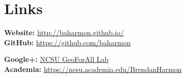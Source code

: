 \documentclass[]{baharmon-cv}
\begin{document}
{{{{{\sectiondivider


\section{Links} 
\begin{minipage}{0.45\textwidth} 
\textbf{Website:} \href{http://baharmon.github.io/}{http://baharmon.github.io/} \vspace{0.36em} \\ 
\textbf{GitHub:} \href{https://github.com/baharmon}{https://github.com/baharmon} %
\end{minipage} 
\begin{minipage}{0.45\textwidth} 
\textbf{Google+:}  \href{https://plus.google.com/u/0/b/112857255995703553144/112857255995703553144/}{NCSU GeoForAll Lab} \vspace{0.36em} \\
\textbf{Academia:} \href{https://ncsu.academia.edu/BrendanHarmon}{https://ncsu.academia.edu/BrendanHarmon}
\end{minipage} 


}}}}}
\end{document}
